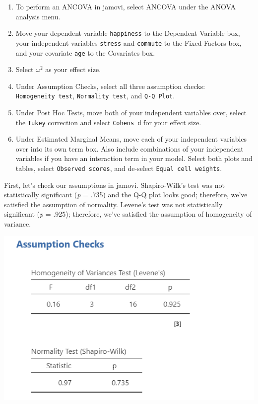 \documentclass[
]{book}
\begin{document}
\begin{enumerate}
\def\labelenumi{\arabic{enumi}.}
\item
  To perform an ANCOVA in jamovi, select ANCOVA under the ANOVA analysis menu.
\item
  Move your dependent variable \texttt{happiness} to the Dependent Variable box, your independent variables \texttt{stress} and \texttt{commute} to the Fixed Factors box, and your covariate \texttt{age} to the Covariates box.
\item
  Select \(\omega^2\) as your effect size.
\item
  Under Assumption Checks, select all three assumption checks: \texttt{Homogeneity\ test}, \texttt{Normality\ test}, and \texttt{Q-Q\ Plot}.
\item
  Under Post Hoc Tests, move both of your independent variables over, select the \texttt{Tukey} correction and select \texttt{Cohen\textquotesingle{}s\ d} for your effect size.
\item
  Under Estimated Marginal Means, move each of your independent variables over into its own term box. Also include combinations of your independent variables if you have an interaction term in your model. Select both plots and tables, select \texttt{Observed\ scores}, and de-select \texttt{Equal\ cell\ weights}.
\end{enumerate}

First, let's check our assumptions in jamovi. Shapiro-Wilk's test was not statistically significant (\emph{p} = .735) and the Q-Q plot looks good; therefore, we've satisfied the assumption of normality. Levene's test was not statistically significant (\emph{p} = .925); therefore, we've satisfied the assumption of homogeneity of variance.

\includegraphics{images/07-ancova/ancova_assumptions.png}
\end{document}
